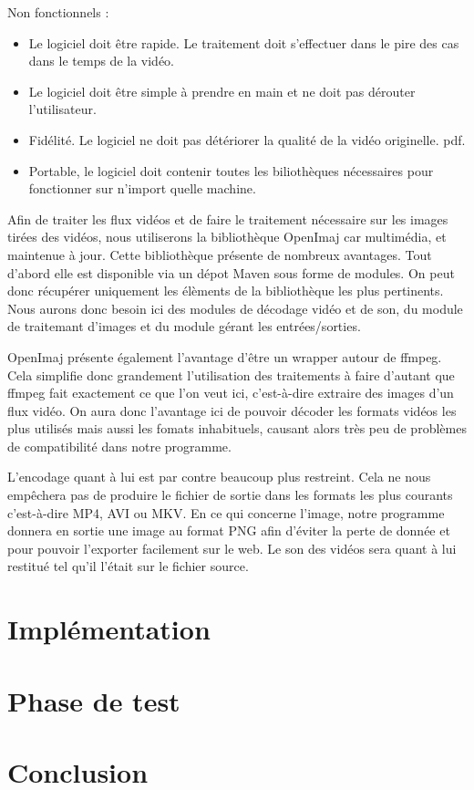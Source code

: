 \documentclass[10pt,a4paper]{article}
\begin{document}
Non fonctionnels :\newline
\begin{itemize}
\item Le logiciel doit être rapide. Le traitement doit s'effectuer dans le pire des cas dans le temps de la vidéo.
\item Le logiciel doit être simple à prendre en main et ne doit pas dérouter l'utilisateur.
\item Fidélité. Le logiciel ne doit pas détériorer la qualité de la vidéo originelle.
pdf.
\item Portable, le logiciel doit contenir toutes les biliothèques nécessaires pour fonctionner sur n'import quelle machine.\newline
\end{itemize}

Afin de traiter les flux vidéos et de faire le traitement nécessaire sur les images tirées des vidéos,
nous utiliserons la bibliothèque OpenImaj car multimédia, et maintenue à jour.
Cette bibliothèque présente de nombreux avantages. Tout d'abord elle est
disponible via un dépot Maven sous forme de modules. On peut donc récupérer uniquement les élèments de la bibliothèque
les plus pertinents. Nous aurons donc besoin ici des modules de décodage vidéo et de son, du module de traitemant d'images
et du module gérant les entrées/sorties.

OpenImaj présente également l'avantage d'être un wrapper autour de ffmpeg.
Cela simplifie donc grandement l'utilisation des traitements à faire d'autant que ffmpeg fait exactement ce que l'on veut ici,
c'est-à-dire extraire des images d'un flux vidéo.
On aura donc l'avantage ici de pouvoir décoder les formats vidéos
les plus utilisés mais aussi les fomats inhabituels, causant alors très peu de problèmes de compatibilité dans notre
programme.

L'encodage quant à lui est par contre beaucoup plus restreint. Cela ne nous empêchera pas de produire
le fichier de sortie dans les formats les plus courants c'est-à-dire MP4, AVI ou MKV.
En ce qui concerne l'image, notre programme donnera en sortie une image au format PNG afin d'éviter la perte de donnée et
pour pouvoir l'exporter facilement sur le web.
Le son des vidéos sera quant à lui restitué tel qu'il l'était sur le fichier source.


\section{Implémentation}
\section{Phase de test}

\section{Conclusion}
\end{document}
